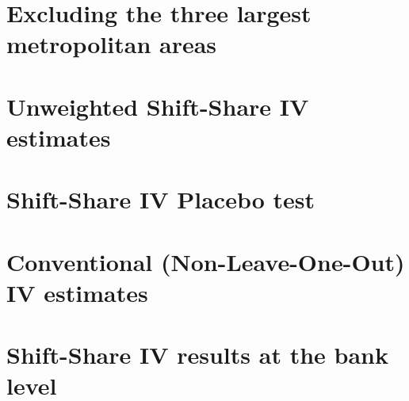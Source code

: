 \documentclass[12pt]{article}
\begin{document}
\section{Excluding the three largest metropolitan areas} \label{iv_nometros}

\begin{table}[H]
    \caption{Shift-Share IV estimates excluding the three largest metropolitan areas}
    \label{iv_nometros_table}
    \centering
    \small
    
\end{table}

\section{Unweighted Shift-Share IV estimates} \label{unweighted}

\begin{table}[H]
    \caption{Unweighted Shift-Share IV estimates}
    \label{unweighted_table}
    \centering
    \small
    
\end{table}

\section{Shift-Share IV Placebo test} \label{placebo}

\begin{table}[H]
    \caption{Placebo tests: Shift-Share IV on pre-period (five-year) outcome changes}
    \label{placebo_table}
    \centering
    \small
    
\end{table}

\section{Conventional (Non-Leave-One-Out) IV estimates} \label{naive}

\begin{table}[H]
    \caption{Shift-Share IV estimates using the conventional (Non-Leave-One-Out) instrument}
    \label{naive_table}
    \centering
    \small
    
\end{table}

\section{Shift-Share IV results at the bank level} \label{bank}

\begin{table}[H]
    \caption{Bank level IV estimates: Khwaja-Mian-style identification at the bank-year}
    \label{bank_table}
    \centering
    \small
    
\end{table}
\end{document}
